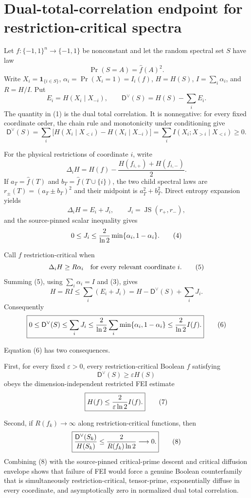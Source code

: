 \section*{Dual-total-correlation endpoint for restriction-critical spectra}

Let $f:\{-1,1\}^n\to\{-1,1\}$ be nonconstant and let the random
spectral set $S$ have law
\[
 \Pr(S=A)=\widehat f(A)^2.
\]
Write $X_i=\mathbf 1_{\{i\in S\}}$, $\alpha_i=\Pr(X_i=1)=I_i(f)$,
$H=H(S)$, $I=\sum_i\alpha_i$, and $R=H/I$.  Put
\[
 E_i=H(X_i\mid X_{-i}),\qquad
 \mathsf D^\vee(S)=H(S)-\sum_iE_i.                         \tag{1}
\]
The quantity in (1) is the dual total correlation.  It is nonnegative:
for every fixed coordinate order, the chain rule and monotonicity under
conditioning give
\[
 \mathsf D^\vee(S)
 =\sum_i\bigl[H(X_i\mid X_{<i})-H(X_i\mid X_{-i})\bigr]
 =\sum_i I(X_i;X_{>i}\mid X_{<i})\ge0.                    \tag{2}
\]

For the physical restrictions of coordinate $i$, write
\[
 \Delta_iH=H(f)-\frac{H(f_{i,+})+H(f_{i,-})}{2}.
\]
If $a_T=\widehat f(T)$ and $b_T=\widehat f(T\cup\{i\})$, the two
child spectral laws are $r_\pm(T)=(a_T\pm b_T)^2$ and their midpoint is
$a_T^2+b_T^2$.  Direct entropy expansion yields
\[
 \Delta_iH=E_i+J_i,\qquad J_i=\operatorname{JS}(r_+,r_-),              \tag{3}
\]
and the source-pinned scalar inequality gives
\[
 0\le J_i\le {2\over\ln2}\min\{\alpha_i,1-\alpha_i\}.                \tag{4}
\]

Call $f$ restriction-critical when
\[
 \Delta_iH\ge R\alpha_i
 \quad\hbox{for every relevant coordinate }i.                         \tag{5}
\]
Summing (5), using $\sum_i\alpha_i=I$ and (3), gives
\[
 H=RI\le\sum_i(E_i+J_i)
 =H-\mathsf D^\vee(S)+\sum_iJ_i.
\]
Consequently
\[
 \boxed{
 0\le\mathsf D^\vee(S)\le\sum_iJ_i
 \le {2\over\ln2}\sum_i\min\{\alpha_i,1-\alpha_i\}
 \le {2\over\ln2}I(f).}                                             \tag{6}
\]

Equation (6) has two consequences.

First, for every fixed $\varepsilon>0$, every restriction-critical Boolean
$f$ satisfying
\[
 \mathsf D^\vee(S)\ge\varepsilon H(S)
\]
obeys the dimension-independent restricted FEI estimate
\[
 \boxed{H(f)\le {2\over\varepsilon\ln2}I(f).}                         \tag{7}
\]

Second, if $R(f_k)\to\infty$ along restriction-critical functions, then
\[
 \boxed{
 {\mathsf D^\vee(S_k)\over H(S_k)}
 \le {2\over R(f_k)\ln2}\longrightarrow0.}                           \tag{8}
\]
Combining (8) with the source-pinned critical-prime descent and critical
diffusion envelope shows that failure of FEI would force a genuine Boolean
counterfamily that is simultaneously restriction-critical, tensor-prime,
exponentially diffuse in every coordinate, and asymptotically zero in
normalized dual total correlation.

